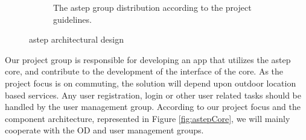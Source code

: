 \begin{figure}[h!]
\begin{subfigure}[b]{0.48\textwidth}
		\caption{The \gls{astep} group distribution according to the project guidelines.}
		\label{fig:astepGroups}
	\end{subfigure}
	\caption{\gls{astep} architectural design}
	\label{fig:astepArchitecture}
\end{figure}

Our project group is responsible for developing an app that utilizes the \gls{astep} core, and contribute to the development of the interface of the core.
As the project focus is on commuting, the solution will depend upon outdoor location based services.
Any user registration, login or other user related tasks should be handled by the user management group.
According to our project focus and the component architecture, represented in Figure \ref{fig:astepCore}, we will mainly cooperate with the OD and user management groups.

